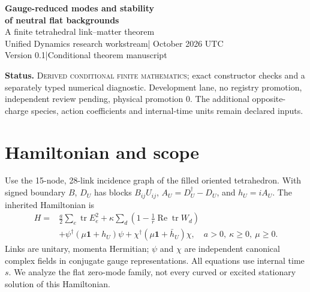 \documentclass[11pt,a4paper]{article}
\newcommand{\tr}{\operatorname{tr}}\newcommand{\Rea}{\operatorname{Re}}\newcommand{\U}{\mathrm U}
\newcommand{\id}{\mathbf1}\newcommand{\dd}{\mathrm d}\newcommand{\diag}{\operatorname{diag}}
\begin{document}
\begin{center}
{\Large\bfseries Gauge-reduced modes and stability\\of neutral flat backgrounds}\\[7pt]
{\large A finite tetrahedral link--matter theorem}\\[9pt]
Unified Dynamics research workstream\quad | October 2026 UTC\\
Version 0.1\quad |\quad Conditional theorem manuscript
\end{center}
\begin{abstract}
For the declared classical joint link--matter Hamiltonian, we classify its zero-frequency flat stationary family, perform regular Abelian Gauss reduction, and compute its exact characteristic polynomial. The 14 link oscillators have five stiffness eigenvalues. Every nonzero member of the neutral family has imaginary spectrum but an unbounded reduced linear flow: matter-frequency Jordan chains survive gauge removal at every positive diamond stiffness, including isolated cancellation parameters and field resonances. A rank-one embedding extends this obstruction to all ranks. We also derive the full higher-rank symplectic-slice polynomial, with its residual stabilizer stated explicitly. In contrast, a conserved positive functional proves nonlinear Lyapunov stability of the zero-matter vacuum gauge orbit at positive stiffness. All results are conditional on the previous candidate action; no physical coupling or experimental claim is made.
\end{abstract}
\textbf{Status.} \textsc{Derived conditional finite mathematics}; exact constructor checks and a separately typed numerical diagnostic. Development lane, no registry promotion, independent review pending, physical promotion $0$. The additional opposite-charge species, action coefficients and internal-time units remain declared inputs.

\section{Hamiltonian and scope}
Use the 15-node, 28-link incidence graph of the filled oriented tetrahedron. With signed boundary $B$, $D_U$ has blocks $B_{ij}U_{ij}$, $A_U=D_U^\dagger-D_U$, and $h_U=iA_U$. The inherited Hamiltonian is
\begin{align*}
H={}&\frac a2\sum_e\tr E_e^2+
\kappa\sum_d\left(1-\frac1r\Rea\tr W_d\right)\\
&+\psi^\dagger(\mu\id+h_U)\psi+
\chi^\dagger(\mu\id+\bar h_U)\chi,
\quad a>0,\ \kappa\geq0,\ \mu\geq0.
\end{align*}
Links are unitary, momenta Hermitian; $\psi$ and $\chi$ are independent canonical complex fields in conjugate gauge representations. All equations use internal time $s$. We analyze the flat zero-mode family, not every curved or excited stationary solution of this Hamiltonian.
\end{document}

